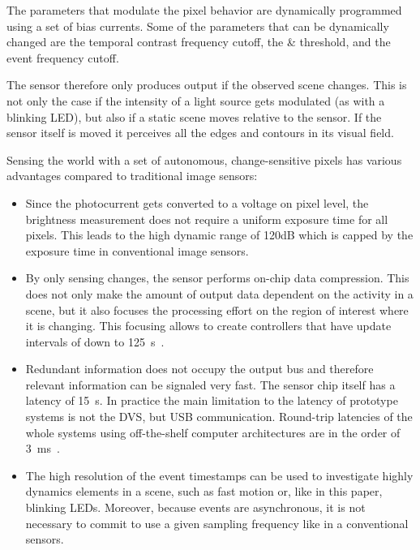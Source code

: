 The parameters that modulate the pixel behavior are dynamically programmed
using a set of bias currents. Some of the parameters that can be dynamically
changed are the temporal contrast frequency cutoff, the \pP \& \pN
threshold, and the event frequency cutoff. 

The sensor therefore only produces output if the observed scene changes.
This is not only the case if the intensity of a light source gets
modulated (as with a blinking LED), but also if a static scene moves
relative to the sensor. If the sensor itself is moved it perceives
all the edges and contours in its visual field.

Sensing the world with a set of autonomous, change-sensitive pixels
has various advantages compared to traditional image sensors:
\begin{itemize}
\item Since the photocurrent gets converted to a voltage on pixel level,
the brightness measurement does not require a uniform exposure time
for all pixels. This leads to the high dynamic range of 120dB which
is capped by the exposure time in conventional image sensors.
\item By only sensing changes, the sensor performs on-chip data compression.
This does not only make the amount of output data dependent on the
activity in a scene, but it also focuses the processing effort on
the region of interest where it is changing. This focusing allows
to create controllers that have update intervals of down to 125~\textmu{}s~\cite{conradt09pencil}.
\item Redundant information does not occupy the output bus and therefore
relevant information can be signaled very fast. The sensor chip itself
has a latency of 15~\textmu{}s. In practice the main limitation to
the latency of prototype systems is not the DVS, but USB communication.
Round-trip latencies of the whole systems using off-the-shelf computer
architectures are in the order of 3~ms~\cite{delbruck07fast}.
\item The high resolution of the event timestamps can be used to investigate
highly dynamics elements in a scene, such as fast motion or, like
in this paper, blinking LEDs. Moreover, because events are asynchronous,
it is not necessary to commit to use a given sampling frequency like
in a conventional sensors.
\end{itemize}
